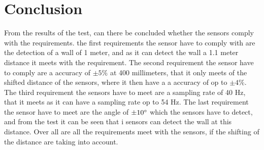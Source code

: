 %
\section*{Conclusion}
From the results of the test, can there be concluded whether the sensors comply with the requirements. the first requirements the sensor have to comply with are the detection of a wall of 1 meter, and as it can detect the wall a 1.1 meter distance it meets with the requirement.
\newline
The second requirement the sensor have to comply are a accuracy of $\pm 5 \%$ at 400 millimeters, that it only meets of the shifted distance of the sensors, where it then have a a accuracy of op to $\pm 4 \%$.
\newline
The third requirement the sensors have to meet are a sampling rate of 40 Hz, that it meets as it can have a sampling rate op to 54 Hz.
The last requirement the sensor have to meet are the angle of $\pm 10 \degree$ which the sensors have to detect, and from the test it can be seen that i sensors can detect the wall at this distance.
\newline 
Over all are all the requirements meet with the sensors, if the shifting of the distance are taking into account. 